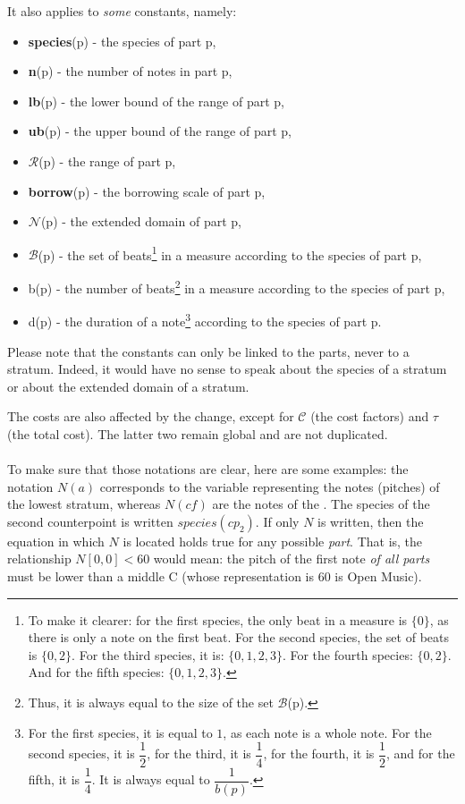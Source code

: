 \noindent It also applies to \textit{some} constants, namely:
\begin{itemize}
    \item \textbf{species}(p) - the species of part p,
    \item \textbf{n}(p) - the number of notes in part p,
    \item \textbf{lb}(p) - the lower bound of the range of part p,
    \item \textbf{ub}(p) - the upper bound of the range of part p,
    \item $\mathcal{R}$(p) - the range of part p,
    \item \textbf{borrow}(p) - the borrowing scale of part p,
    \item $\mathcal{N}$(p) - the extended domain of part p,
    \item $\mathcal{B}$(p) - the set of beats\footnote{To make it clearer: for the first species, the only beat in a measure is $\{0\}$, as there is only a note on the first beat. For the second species, the set of beats is $\{0, 2\}$. For the third species, it is: $\{0, 1, 2, 3\}$. For the fourth species: $\{0, 2\}$. And for the fifth species: $\{0, 1, 2, 3\}$.} in a measure according to the species of part p,
    \item b(p) - the number of beats\footnote{Thus, it is always equal to the size of the set $\mathcal{B}$(p).} in a measure according to the species of part p,
    \item d(p) - the duration of a note\footnote{For the first species, it is equal to $1$, as each note is a whole note. For the second species, it is $\dfrac{1}{2}$, for the third, it is $\dfrac{1}{4}$, for the fourth, it is $\dfrac{1}{2}$, and for the fifth, it is $\dfrac{1}{4}$. It is always equal to $\dfrac{1}{b(p)}$.} according to the species of part p.
\end{itemize}
Please note that the constants can only be linked to the parts, never to a stratum. Indeed, it would have no sense to speak about the species of a stratum or about the extended domain of a stratum.

The costs are also affected by the change, except for $\mathcal{C}$ (the cost factors) and $\tau$ (the total cost). The latter two remain global and are not duplicated.

\paragraph{}
To make sure that those notations are clear, here are some examples: the notation $N(a)$ corresponds to the variable representing the notes (pitches) of the lowest stratum, whereas $N(\mathit{cf})$ are the notes of the \cf. The species of the second counterpoint is written $species(cp_2)$. If only $N$ is written, then the equation in which $N$ is located holds true for any possible \textit{part}. That is, the relationship $N[0, 0] < 60$ would mean: the pitch of the first note \textit{of all parts} must be lower than a middle C (whose representation is 60 is Open Music).

